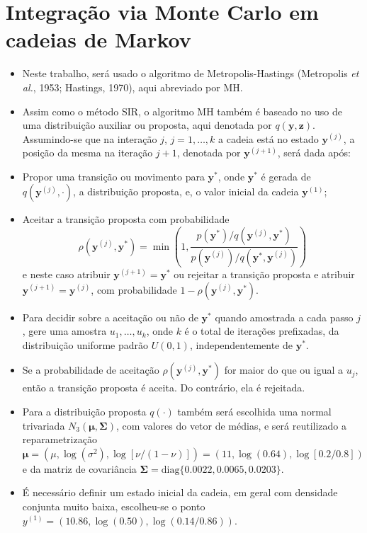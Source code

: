 \documentclass[9pt]{beamer}
\begin{document}
\section{Integração via Monte Carlo em cadeias de Markov}
\begin{frame}
\begin{itemize}
\justifying	
\item Neste trabalho, será usado o algoritmo de Metropolis-Hastings (Metropolis \textit{et al.}, 1953; Hastings, 1970), aqui abreviado por MH.
\item Assim como o método SIR, o algoritmo MH também é baseado no uso de uma distribuição auxiliar ou proposta, aqui denotada por $q(\bm{y}, \bm{z})$. Assumindo-se que na interação $j$, $j = 1, \ldots, k$ a cadeia está no estado $\bm{y}^{(j)}$, a posição da mesma na iteração $j + 1$, denotada por $\bm{y}^{(j + 1)}$, será dada após:
\item Propor uma transição ou movimento para $\bm{y}^*$, onde $\bm{y}^*$ é gerada de $q(\bm{y}^{(j)}, \cdot)$, a distribuição proposta, e, o valor inicial da cadeia $\mathbf{y}^{(1)}$;
\item Aceitar a transição proposta com probabilidade
\begin{equation}\label{eq:mh_tranprob}
\rho(\bm{y}^{(j)}, \bm{y}^*) = \min\left(1, \dfrac{p(\bm{y}^*) / q(\bm{y}^{(j)}, \bm{y}^*)}{p(\bm{y}^{(j)}) / q(\bm{y}^*, \bm{y}^{(j)})}\right)
\end{equation}
e neste caso atribuir $\bm{y}^{(j + 1)} = \bm{y}^*$ ou rejeitar a transição proposta e atribuir $\bm{y}^{(j + 1)} = \bm{y}^{(j)}$, com probabilidade $1 - \rho(\bm{y}^{(j)}, \bm{y}^*)$.
\end{itemize}
\end{frame}
\begin{frame}
\begin{itemize}
\justifying	
\item Para decidir sobre a aceitação ou não de $\bm{y}^*$ quando amostrada a cada passo $j$, gere uma amostra $u_1, \ldots, u_k$, onde $k$ é o total de iterações prefixadas, da distribuição uniforme padrão $U(0,1)$, independentemente de $\bm{y}^*$.
\item Se a probabilidade de aceitação $\rho(\bm{y}^{(j)}, \bm{y}^*)$ for maior do que ou igual a $u_j$, então a transição proposta é aceita. Do contrário, ela é rejeitada.
\item Para a distribuição proposta $q(\cdot)$ também será escolhida uma normal trivariada $N_3(\bm{\mu}, \bm{\Sigma})$, com valores do vetor de médias, e será reutilizado a reparametrização $\bm{\mu} = (\mu, \log(\sigma^2), \log[\nu/(1-\nu)]) = (11, \log(0.64), \log[0.2/0.8])$ e da matriz de covariância $\bm{\Sigma} = \textrm{diag}\{0.0022, 0.0065, 0.0203\}$.
\item É necessário definir um estado inicial da cadeia, em geral com densidade conjunta muito baixa, escolheu-se o ponto $y^{(1)} = (10.86, \log(0.50),\log(0.14/0.86))$. 
\end{itemize}
\end{frame}
\end{document}
